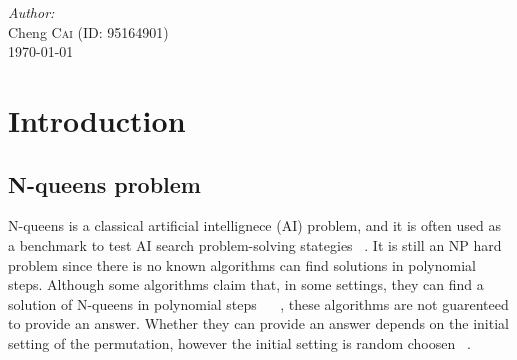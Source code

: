 \begin{titlepage}
\Large \emph{Author:}\\
Cheng \textsc{Cai} (ID: 95164901)\\[3cm] %


{\large \today}\\[2cm] %


 

\vfill %

\end{titlepage}




\section{Introduction}
\subsection{N-queens problem}
N-queens is a classical artificial intellignece (AI) problem, and it is often used as a benchmark to test AI search problem-solving stategies ~\cite{sosic_polynomial_1990}. It is still an NP hard problem since there is no known algorithms can find solutions in polynomial steps. Although some algorithms claim that, in some settings, they can find a solution of N-queens in polynomial steps ~\cite{sosic_polynomial_1990} ~\cite{bernhardsson_explicit_1991}, these algorithms are not guarenteed to provide an answer. Whether they can provide an answer depends on the initial setting of the permutation, however the initial setting is random choosen ~\cite{sosic_polynomial_1990}.

